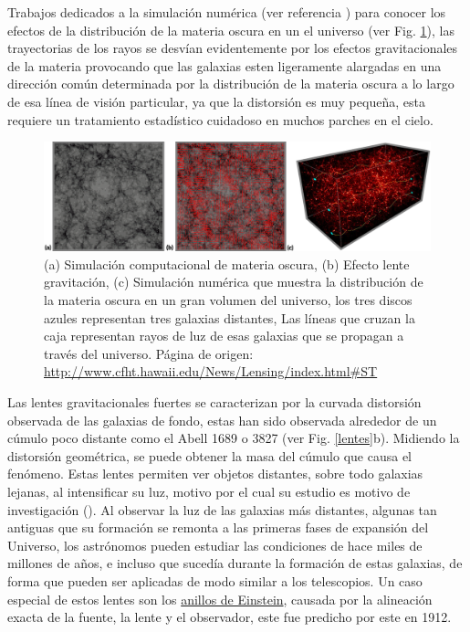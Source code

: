 Trabajos dedicados a la simulación numérica (ver referencia \citep{munshi_statistics_2001, fosalba_mice_2015}) para conocer los efectos de la distribución de la materia oscura en un el universo (ver Fig. \ref{lentes3}), las trayectorias de los rayos se desvían evidentemente por los efectos gravitacionales de la materia provocando que las galaxias esten ligeramente alargadas en una dirección común determinada por la distribución de la materia oscura a lo largo de esa línea de visión particular, ya que la distorsión es muy pequeña, esta requiere un tratamiento estadístico cuidadoso en muchos parches en el cielo.
\begin{figure}[h]
\centering
\includegraphics[width=1\textwidth]{Fisica_de_Particulas/imagenes/lentes3.png}
\caption{(a) Simulación computacional de materia oscura, (b) Efecto lente gravitación, (c) Simulación numérica que muestra la distribución de la materia oscura en un gran volumen del universo,  los tres discos azules representan tres galaxias distantes, Las líneas que cruzan la caja representan rayos de luz de esas galaxias que se propagan a través del universo. Página de origen: \url{http://www.cfht.hawaii.edu/News/Lensing/index.html\#ST}}
\label{lentes3}
\end{figure}
Las lentes gravitacionales fuertes se caracterizan por la curvada distorsión observada de las galaxias de fondo, estas han sido observada alrededor de un cúmulo poco distante como el Abell 1689 o 3827 (ver Fig. \ref{lentes}b). Midiendo la distorsión geométrica, se puede obtener la masa del cúmulo que causa el fenómeno. Estas lentes permiten ver objetos distantes, sobre todo galaxias lejanas, al intensificar su luz, motivo por el cual su estudio es motivo de investigación (\cite{schafer_lenstool-hpc_2020}). Al observar la luz de las galaxias más distantes, algunas tan antiguas que su formación se remonta a las primeras fases de expansión del Universo, los astrónomos pueden estudiar las condiciones de hace miles de millones de años, e incluso que sucedía durante la formación de estas galaxias, de forma que pueden ser aplicadas de modo similar a los telescopios. Un caso especial de estos lentes son los \href{https://en.wikipedia.org/wiki/Einstein_ring}{anillos de Einstein}, causada por la alineación exacta de la fuente, la lente y el observador, este fue predicho por este en 1912.

